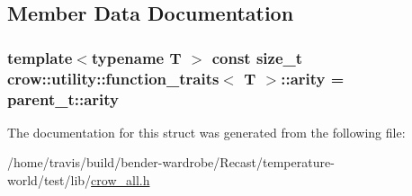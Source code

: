 \subsection{Member Data Documentation}
\hypertarget{structcrow_1_1utility_1_1function__traits_a6736e81b2deba53e7441119cbbe04617}{
\subsubsection[{arity}]{\setlength{\rightskip}{0pt plus 5cm}template$<$typename T $>$ const size\-\_\-t {\bf crow\-::utility\-::function\-\_\-traits}$<$ T $>$\-::arity = parent\-\_\-t\-::arity\hspace{0.3cm}{\ttfamily [static]}}}\label{structcrow_1_1utility_1_1function__traits_a6736e81b2deba53e7441119cbbe04617}


The documentation for this struct was generated from the following file\-:\begin{DoxyCompactItemize}
\item 
/home/travis/build/bender-\/wardrobe/\-Recast/temperature-\/world/test/lib/\hyperlink{crow__all_8h}{crow\-\_\-all.\-h}\end{DoxyCompactItemize}
